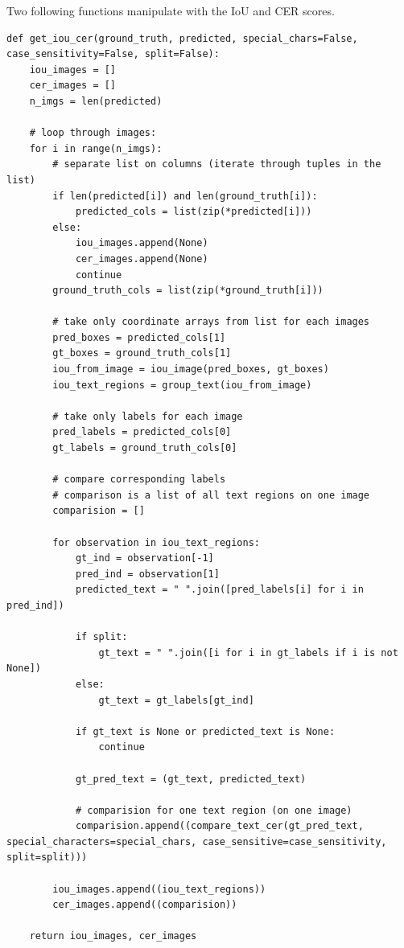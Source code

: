 Two following functions manipulate with the IoU and CER scores.

\begin{lstlisting}[caption=get\_iou\_cer]
def get_iou_cer(ground_truth, predicted, special_chars=False, case_sensitivity=False, split=False):
    iou_images = []
    cer_images = []
    n_imgs = len(predicted)
    
    # loop through images:
    for i in range(n_imgs):
        # separate list on columns (iterate through tuples in the list)
        if len(predicted[i]) and len(ground_truth[i]):
            predicted_cols = list(zip(*predicted[i]))
        else:
            iou_images.append(None)
            cer_images.append(None)
            continue
        ground_truth_cols = list(zip(*ground_truth[i]))

        # take only coordinate arrays from list for each images
        pred_boxes = predicted_cols[1]
        gt_boxes = ground_truth_cols[1]
        iou_from_image = iou_image(pred_boxes, gt_boxes)
        iou_text_regions = group_text(iou_from_image)
      
        # take only labels for each image
        pred_labels = predicted_cols[0]
        gt_labels = ground_truth_cols[0]

        # compare corresponding labels
        # comparison is a list of all text regions on one image
        comparision = []

        for observation in iou_text_regions:
            gt_ind = observation[-1]
            pred_ind = observation[1]
            predicted_text = " ".join([pred_labels[i] for i in pred_ind])

            if split:
                gt_text = " ".join([i for i in gt_labels if i is not None])
            else:
                gt_text = gt_labels[gt_ind]

            if gt_text is None or predicted_text is None:
                continue
                
            gt_pred_text = (gt_text, predicted_text)

            # comparision for one text region (on one image)
            comparision.append((compare_text_cer(gt_pred_text, special_characters=special_chars, case_sensitive=case_sensitivity, split=split)))

        iou_images.append((iou_text_regions))
        cer_images.append((comparision))

    return iou_images, cer_images
\end{lstlisting}

